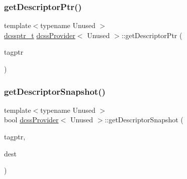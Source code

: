 \mbox{\label{classdcssProvider_a2db1d4b9d935494d9b3c661d9b4dd816}} 
\subsubsection{\texorpdfstring{get\+Descriptor\+Ptr()}{getDescriptorPtr()}}
{\footnotesize\ttfamily template$<$typename Unused $>$ \\
\hyperlink{dcss_8h_ad0886cc4b71b2b53b8d1463285223511}{dcssptr\+\_\+t} \hyperlink{classdcssProvider}{dcss\+Provider}$<$ Unused $>$\+::get\+Descriptor\+Ptr (\begin{DoxyParamCaption}\item[{\hyperlink{descriptors_8h_afd8a7b57046ed96897cda907f17737a7}{tagptr\+\_\+t}}]{tagptr }\end{DoxyParamCaption})\hspace{0.3cm}{\ttfamily [inline]}}

\mbox{\label{classdcssProvider_a5974e4e1d622b9b449b86239ca4e939e}} 
\subsubsection{\texorpdfstring{get\+Descriptor\+Snapshot()}{getDescriptorSnapshot()}}
{\footnotesize\ttfamily template$<$typename Unused $>$ \\
bool \hyperlink{classdcssProvider}{dcss\+Provider}$<$ Unused $>$\+::get\+Descriptor\+Snapshot (\begin{DoxyParamCaption}\item[{\hyperlink{descriptors_8h_afd8a7b57046ed96897cda907f17737a7}{tagptr\+\_\+t}}]{tagptr,  }\item[{\hyperlink{dcss_8h_ad0886cc4b71b2b53b8d1463285223511}{dcssptr\+\_\+t} const}]{dest }\end{DoxyParamCaption})\hspace{0.3cm}{\ttfamily [inline]}}

\mbox{\label{classdcssProvider_aee562dd1921b5ee8150dc17e535124be}} 
